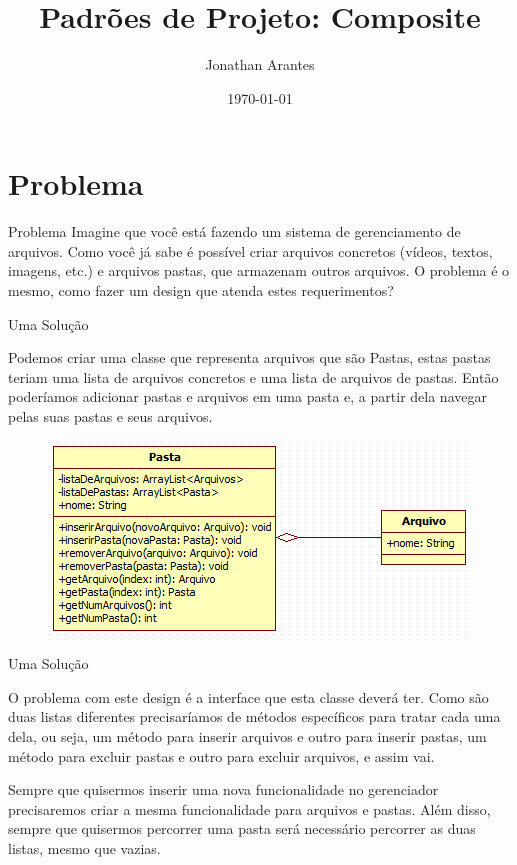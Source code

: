 \documentclass{beamer}
\title{Padrões de Projeto: Composite}
\date{\today}
\author{Jonathan Arantes}
\institute{Instituto Federal de Minas Gerais - Campus Formiga}
\begin{document}
  \lstset{basicstyle=\tiny,style=JavaStyle}
  \maketitle
  \section{Problema}
  \begin{frame}{Problema}
Imagine que você está fazendo um sistema de gerenciamento de arquivos. Como você já sabe é possível criar arquivos concretos (vídeos, textos, imagens, etc.) e arquivos pastas, que armazenam outros arquivos. O problema é o mesmo, como fazer um design que atenda estes requerimentos?
  \end{frame}

  \begin{frame}{Uma Solução}

Podemos criar uma classe que representa arquivos que são Pastas, estas pastas teriam uma lista de arquivos concretos e uma lista de arquivos de pastas. Então poderíamos adicionar pastas e arquivos em uma pasta e, a partir dela navegar pelas suas pastas e seus arquivos.

  \begin{figure}
    \includegraphics[scale=0.8]{composite-errado.png}
  \end{figure}

  \end{frame}

  \begin{frame}{Uma Solução}

O problema com este design é a interface que esta classe deverá ter. Como são duas listas diferentes precisaríamos de métodos específicos para tratar cada uma dela, ou seja, um método para inserir arquivos e outro para inserir pastas, um método para excluir pastas e outro para excluir arquivos, e assim vai.

Sempre que quisermos inserir uma nova funcionalidade no gerenciador precisaremos criar a mesma funcionalidade para arquivos e pastas. Além disso, sempre que quisermos percorrer uma pasta será necessário percorrer as duas listas, mesmo que vazias.

  \end{frame}
\end{document}

